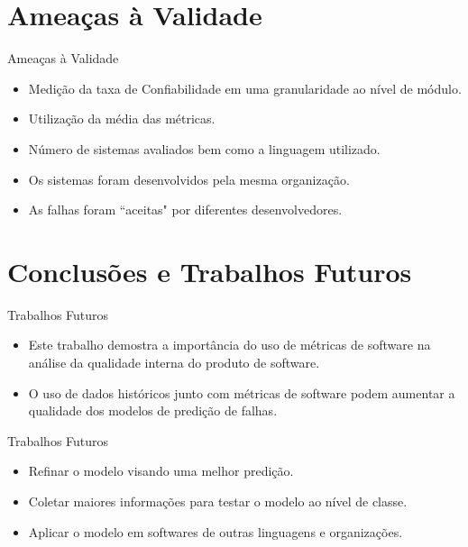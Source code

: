 \documentclass[t,14pt,mathserif]{beamer}
\begin{document}
\section{Ameaças à Validade}
\begin{frame}{Ameaças à Validade}

	\begin{itemize}
	
		\item Medição da taxa de Confiabilidade em uma granularidade ao nível de módulo.
		\item Utilização da média das métricas.
		\item Número de sistemas avaliados bem como a linguagem utilizado.
		\item Os sistemas foram desenvolvidos pela mesma organização.
		\item As falhas foram ``aceitas" por diferentes desenvolvedores.
	\end{itemize}		
	
\end{frame}

\section{Conclusões e Trabalhos Futuros}
\begin{frame}{Trabalhos Futuros}
	
	\begin{itemize}
		\item Este trabalho demostra a importância do uso de métricas de software na análise da qualidade interna do produto de software.
		\item O uso de dados históricos junto com métricas de software podem aumentar a qualidade dos modelos de predição de falhas.
	\end{itemize}

\end{frame}


\begin{frame}{Trabalhos Futuros}
	\begin{itemize}
	
		\item Refinar o modelo visando uma melhor predição.
		\item Coletar maiores informações para testar o modelo ao nível de classe.
		\item Aplicar o modelo em softwares de outras linguagens e organizações.

	\end{itemize}

\end{frame}
\end{document}
